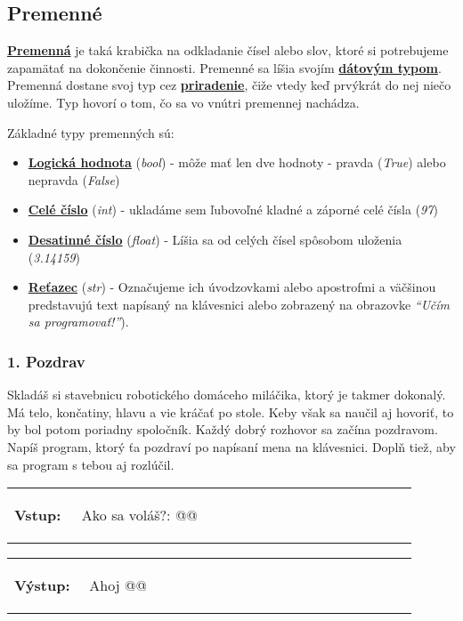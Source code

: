 \subsection{Premenné}
\underline{\textbf{Premenná}} je taká krabička na odkladanie čísel alebo slov, ktoré si potrebujeme zapamätať na dokončenie činnosti. Premenné sa líšia svojím \underline{\textbf{dátovým typom}}. Premenná dostane svoj typ cez \underline{\textbf{priradenie}}, čiže vtedy keď prvýkrát do nej niečo uložíme. Typ hovorí o tom, čo sa vo vnútri premennej nachádza.

Základné typy premenných sú:
\begin{itemize}[noitemsep,topsep=0pt]
\item \underline{\textbf{Logická hodnota}} (\textit{bool}) - môže mať len dve hodnoty - pravda (\textit{True}) alebo nepravda (\textit{False})
\item \underline{\textbf{Celé číslo}} (\textit{int}) - ukladáme sem ľubovoľné kladné a záporné celé čísla (\textit{97})
\item \underline{\textbf{Desatinné číslo}} (\textit{float}) - Líšia sa od celých čísel spôsobom uloženia (\textit{3.14159})
\item \underline{\textbf{Reťazec}} (\textit{str}) - Označujeme ich úvodzovkami alebo apostrofmi a väčšinou predstavujú text napísaný na klávesnici alebo zobrazený na obrazovke \textit{``Učím sa programovať!''}).
\end{itemize}

\subsubsection*{1. Pozdrav}
Skladáš si stavebnicu robotického domáceho miláčika, ktorý je takmer dokonalý. Má telo, končatiny, hlavu a vie kráčať po stole. Keby však sa naučil aj hovoriť, to by bol potom poriadny spoločník. Každý dobrý rozhovor sa začína pozdravom. Napíš program, ktorý ťa pozdraví po napísaní mena na klávesnici. Doplň tiež, aby sa program s tebou aj rozlúčil.

\begin{tabular}{@{}p{0.15\linewidth}p{0.75\linewidth}}
\textbf{\small Vstup:} &
\vspace{-3em}
\begin{code}
Ako sa voláš?: @\fbox{\phantom{meno}}@
\end{code}
\end{tabular}

\vspace{-2em}
\begin{tabular}{@{}p{0.15\linewidth}p{0.75\linewidth}}
\textbf{\small Výstup:} &
\vspace{-3em}
\begin{code}
Ahoj @\fbox{\phantom{meno}}@
\end{code}
\end{tabular}
\vspace{-2em}

